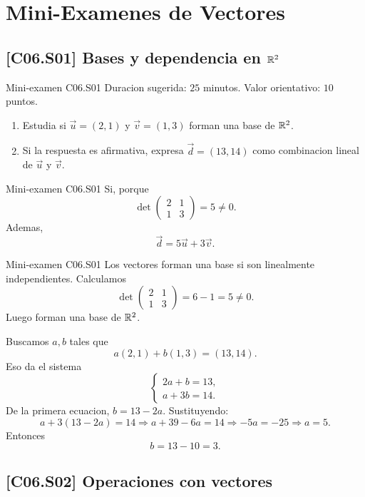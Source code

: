 \chapter{Mini-Examenes de Vectores}

\section{[C06.S01] Bases y dependencia en \texorpdfstring{\(\mathbb{R}^2\)}{R2}}

\begin{exambrief}{Mini-examen C06.S01}
Duracion sugerida: \(25\) minutos. Valor orientativo: \(10\) puntos.
\begin{enumerate}
  \item Estudia si \(\vec u=(2,1)\) y \(\vec v=(1,3)\) forman una base de \(\mathbb{R}^2\).
  \item Si la respuesta es afirmativa, expresa \(\vec d=(13,14)\) como combinacion lineal de
  \(\vec u\) y \(\vec v\).
\end{enumerate}
\end{exambrief}

\begin{shortanswer}{Mini-examen C06.S01}
Si, porque
\[
\det\begin{pmatrix}2&1\\1&3\end{pmatrix}=5\neq 0.
\]
Ademas,
\[
\vec d=5\vec u+3\vec v.
\]
\end{shortanswer}

\begin{fullsolution}{Mini-examen C06.S01}
Los vectores forman una base si son linealmente independientes. Calculamos
\[
\det\begin{pmatrix}2&1\\1&3\end{pmatrix}=6-1=5\neq 0.
\]
Luego forman una base de \(\mathbb{R}^2\).

Buscamos \(a,b\) tales que
\[
a(2,1)+b(1,3)=(13,14).
\]
Eso da el sistema
\[
\begin{cases}
2a+b=13,\\
a+3b=14.
\end{cases}
\]
De la primera ecuacion, \(b=13-2a\). Sustituyendo:
\[
a+3(13-2a)=14
\Longrightarrow
a+39-6a=14
\Longrightarrow
-5a=-25
\Longrightarrow
a=5.
\]
Entonces
\[
b=13-10=3.
\]
\end{fullsolution}

\section{[C06.S02] Operaciones con vectores}


